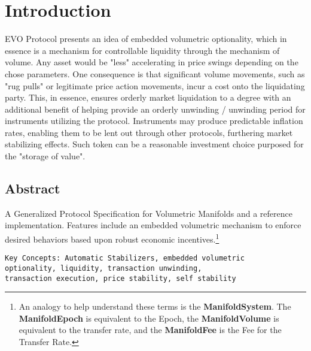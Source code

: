


\chapter{Introduction}\label{sec:introduction}

EVO Protocol presents an idea of embedded volumetric optionality, which in essence is a mechanism for controllable liquidity through the mechanism of volume. Any asset would be "less" accelerating in price swings depending on the chose parameters. One consequence is that significant volume movements, such as "rug pulls" or
legitimate price action movements, incur a cost onto the liquidating party. This, in essence, ensures orderly market liquidation to a degree with an additional
benefit of helping provide an orderly unwinding / unwinding period for instruments utilizing the protocol. Instruments may produce predictable inflation rates,
enabling them to be lent out through other protocols, furthering market stabilizing effects. Such token can be a reasonable investment choice purposed for the "storage of value".



\section{Abstract}\label{sec:preamble}
A Generalized Protocol Specification for Volumetric Manifolds and a reference implementation. Features include an embedded  volumetric mechanism to enforce desired
behaviors based upon robust economic incentives.\footnote{An analogy to help understand these terms is the \textbf{ManifoldSystem}. The \textbf{ManifoldEpoch} is
equivalent to the Epoch, the \textbf{ManifoldVolume} is equivalent to the transfer rate, and the \textbf{ManifoldFee} is the Fee for the Transfer Rate.}
\begin{verbatim}
Key Concepts: Automatic Stabilizers, embedded volumetric
optionality, liquidity, transaction unwinding, 
transaction execution, price stability, self stability
 \end{verbatim}

